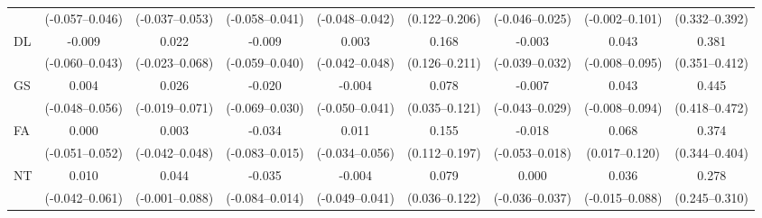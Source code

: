 \documentclass[preprint,12pt,authoryear]{sn-jnl}
\begin{document}
\begin{table}[H]
{\begin{tabular}{lcccccccc}
 & (-0.057--0.046) & (-0.037--0.053) & (-0.058--0.041) & (-0.048--0.042) & (0.122--0.206) & (-0.046--0.025) & (-0.002--0.101) & (0.332--0.392) \\
DL & -0.009 & 0.022 & -0.009 & 0.003 & 0.168 & -0.003 & 0.043 & 0.381 \\
 & (-0.060--0.043) & (-0.023--0.068) & (-0.059--0.040) & (-0.042--0.048) & (0.126--0.211) & (-0.039--0.032) & (-0.008--0.095) & (0.351--0.412) \\
GS & 0.004 & 0.026 & -0.020 & -0.004 & 0.078 & -0.007 & 0.043 & 0.445 \\
 & (-0.048--0.056) & (-0.019--0.071) & (-0.069--0.030) & (-0.050--0.041) & (0.035--0.121) & (-0.043--0.029) & (-0.008--0.094) & (0.418--0.472) \\
FA & 0.000 & 0.003 & -0.034 & 0.011 & 0.155 & -0.018 & 0.068 & 0.374 \\
 & (-0.051--0.052) & (-0.042--0.048) & (-0.083--0.015) & (-0.034--0.056) & (0.112--0.197) & (-0.053--0.018) & (0.017--0.120) & (0.344--0.404) \\
NT & 0.010 & 0.044 & -0.035 & -0.004 & 0.079 & 0.000 & 0.036 & 0.278 \\
 & (-0.042--0.061) & (-0.001--0.088) & (-0.084--0.014) & (-0.049--0.041) & (0.036--0.122) & (-0.036--0.037) & (-0.015--0.088) & (0.245--0.310) \\
\bottomrule
\end{tabular}
}
\end{table}
\end{document}
